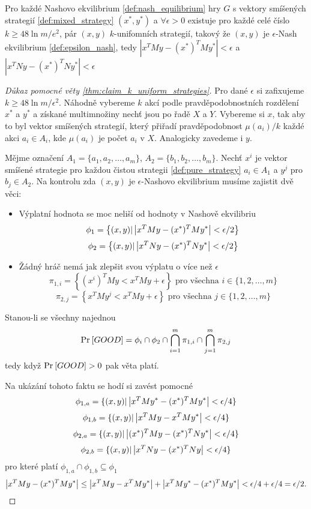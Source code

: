 \begin{theorem}
\label{thm:claim_k_uniform_strategies}
Pro každé Nashovo ekvilibrium \ref{def:nash_equilibrium} hry $G$ s vektory smíšených strategií \ref{def:mixed_strategy} $(x^*, y^*)$ a $\forall \epsilon > 0$ existuje pro každé celé číslo $k \geq 48 \ln m/e^2$, pár $(x,y)$ $k$-unifomních strategií, takový že $(x,y)$ je $\epsilon$-Nash ekvilibrium \ref{def:epsilon_nash}, tedy $|x^T M y - (x^*)^T M y^*| < \epsilon$ a $|x^T N y - (x^*)^T N y^*| < \epsilon$
\end{theorem}
\begin{proof}[Důkaz pomocné věty \ref{thm:claim_k_uniform_strategies}]
    Pro dané $\epsilon$ si zafixujeme $k \geq 48 \ln m / \epsilon^2$.
    Náhodně vybereme $k$ akcí podle pravděpodobnostních rozdělení $x^*$ a $y^*$ a získané multimnožiny nechť jsou po řadě $X$ a $Y$. 
    Vybereme si $x$, tak aby to byl vektor smíšených strategií, který přiřadí pravděpodobnost $\mu (a_i)/k$ každé akci $a_i \in A_i$, kde $\mu(a_i)$ je počet $a_i$ v $X$. 
    Analogicky zavedeme i $y$. 

    Mějme označení $A_1 = \{a_1, a_2, \dots, a_m\}$, $A_2 = \{b_1, b_2, \dots, b_m\}$. 
    Nechť $x^i$ je vektor smíšené strategie pro každou čistou strategii \ref{def:pure_strategy} $a_i \in A_1$ a $y^j$ pro $b_j \in A_2$. 
    Na kontrolu zda $(x,y)$ je $\epsilon$-Nashovo ekvilibrium musíme zajistit dvě věci:
\begin{itemize}
    \item Výplatní hodnota se moc neliší od hodnoty v Nashově ekvilibriu
        $$
            \phi_1 = \left\{ (x,y) | \left|x^T M y - (x^*)^T M y^*\right| < \epsilon /2 \right\} 
        $$ 
        $$ 
            \phi_2 = \left\{ (x,y) | \left|x^T N y - (x^*)^T N y^*\right| < \epsilon /2 \right\}
        $$ 
    \item Žádný hráč nemá jak zlepšit svou výplatu o více než $\epsilon$
        $$ 
        \pi_{1,i} = \left\{ (x^i)^T M y < x^T M y + \epsilon\right\} \text{ pro všechna } i \in \{1,2, \dots, m\}
        $$ 
        $$ 
        \pi_{2,j} = \left\{ x^T M y^j < x^T M y + \epsilon\right\} \text{ pro všechna } j \in \{1,2, \dots, m\}
        $$ 
\end{itemize}
Stanou-li se všechny najednou 
$$ 
\text{Pr}_{}\left[GOOD\right] = \phi_i \cap \phi_2 \cap \bigcap^m_{i=1} \pi_{1,i} \cap \bigcap^m_{j=1} \pi_{2,j} 
$$ 
tedy když $\text{Pr}_{}\left[GOOD\right] > 0$ pak věta platí. 

Na ukázání tohoto faktu se hodí si zavést pomocné 
$$ 
\phi_{1,a} = \{(x,y) | \left|x^T M y^* - (x^*)^T M y^*\right| < \epsilon/4 \}
$$ 
$$ 
\phi_{1,b} = \{(x,y) | \left|x^T M y - x^T M y^*\right| < \epsilon/4 \}
$$ 
$$ 
\phi_{2,a} = \{(x,y) | \left|(x^*)^T M y - (x^*)^T N y^*\right| < \epsilon/4 \}
$$ 
$$ 
\phi_{2,b} = \{(x,y) | \left|x^T N y -  (x^*)^T N y\right| < \epsilon/4 \}
$$ 
pro které platí $\phi_{1,a} \cap \phi_{1,b} \subseteq \phi_1$ 
$$ 
\left|x^T M y - (x^*)^T M y^*\right| \leq \left|x^T M y - x^T M y^*\right| + \left|x^T M y^* - (x^*)^T M y^*\right| < \epsilon/4 + \epsilon/4 = \epsilon/2.
$$


\end{proof}
